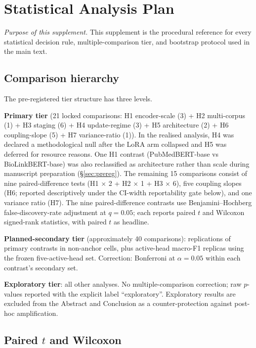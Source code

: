 \section{Statistical Analysis Plan}
\label{supp:stats-plan}

\textit{Purpose of this supplement.}\;
This supplement is the procedural reference for every statistical
decision rule, multiple-comparison tier, and bootstrap protocol
used in the main text.

\subsection{Comparison hierarchy}

The pre-registered tier structure has three levels.

\textbf{Primary tier} (21 locked comparisons: H1 encoder-scale (3) +
H2 multi-corpus (1) + H3 staging (6) + H4 update-regime (3) + H5
architecture (2) + H6 coupling-slope (5) + H7 variance-ratio (1)).
In the realised analysis, H4 was declared a methodological null
after the LoRA arm collapsed and H5 was deferred for resource
reasons. One H1 contrast (PubMedBERT-base vs BioLinkBERT-base) was
also reclassified as architecture rather than scale during
manuscript preparation (\S\ref{sec:prereg}). The remaining 15 comparisons
consist of nine paired-difference tests (H1$\,\times\,$2 +
H2$\,\times\,$1 + H3$\,\times\,$6), five coupling slopes (H6;
reported descriptively under the CI-width reportability gate
below), and one variance ratio (H7). The nine paired-difference
contrasts use Benjamini--Hochberg false-discovery-rate adjustment
\citep{benjamini1995controlling} at $q = 0.05$; each reports
paired $t$ and Wilcoxon \citep{wilcoxon1945individual} signed-rank
statistics, with paired $t$ as headline.

\textbf{Planned-secondary tier} (approximately 40 comparisons):
replications of primary contrasts in non-anchor cells, plus
active-head macro-F1 replicas using the frozen five-active-head set.
Correction: Bonferroni at $\alpha = 0.05$ within each contrast's
secondary set.

\textbf{Exploratory tier}: all other analyses. No multiple-comparison
correction; raw $p$-values reported with the explicit label
``exploratory''. Exploratory results are excluded from the Abstract
and Conclusion as a counter-protection against post-hoc
amplification.

\subsection{Paired $t$ and Wilcoxon}

